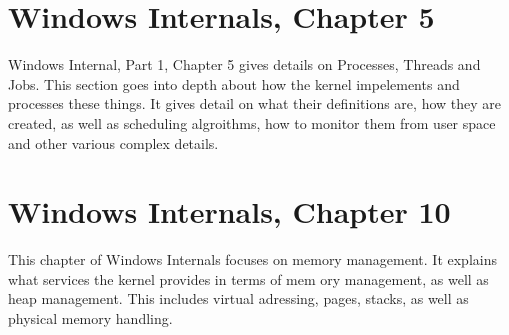 \documentclass[titlepage]{article}
\begin{document}
\section{Windows Internals, Chapter 5}
\begin{singlespace}
    \cite{windowsch5}Windows Internal, Part 1, Chapter 5 gives details on Processes, Threads and Jobs. This section goes into depth about how the kernel impelements and processes these things. It gives detail on what their definitions are, how they are created, as well as scheduling algroithms, how to monitor them from user space and other various complex details.
\end{singlespace}

\section{Windows Internals, Chapter 10}
\begin{singlespace}
    \cite{windowsch10}This chapter of Windows Internals focuses on memory management. It explains what services the kernel provides in terms of mem    ory management, as well as heap management. This includes virtual adressing, pages, stacks, as well as physical memory handling.
\end{singlespace}

\newpage


\end{document}
